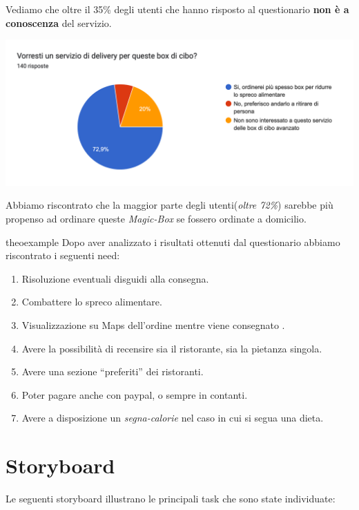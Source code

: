 \documentclass{article}
\begin{document}
Vediamo che oltre il 35\% degli utenti che hanno risposto al questionario \textbf{non è a conoscenza} del servizio.\par \vspace{1cm}
\includegraphics[width=\textwidth]{Data/Grafici/totg_delivery.png} \par
Abbiamo riscontrato che la maggior parte degli utenti(\textit{oltre 72\%}) sarebbe più propenso ad ordinare queste \textit{Magic-Box} se fossero ordinate a domicilio.
\begin{need}{}{theoexample}
    Dopo aver analizzato i risultati ottenuti dal questionario abbiamo riscontrato i seguenti need:
    \begin{enumerate}
        \item Risoluzione eventuali disguidi alla consegna.
        \item Combattere lo spreco alimentare.
        \item Visualizzazione su Maps dell'ordine mentre viene consegnato .
        \item Avere la possibilità di recensire sia il ristorante, sia la pietanza singola.
        \item Avere una sezione “preferiti” dei ristoranti.
        \item Poter pagare anche con paypal, o sempre in contanti.
        \item Avere a disposizione un \textit{segna-calorie} nel caso in cui si segua una dieta.
    \end{enumerate}
    \end{need}

    \vspace{1cm}




    \vspace{4cm}

\section{Storyboard} \par
Le seguenti storyboard illustrano le principali task che sono state individuate:
\end{document}
